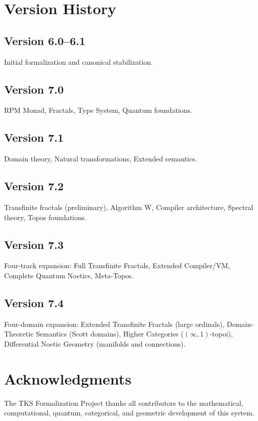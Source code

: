 \documentclass[11pt,twoside,openright]{book}
\theoremstyle{definition}
\theoremstyle{plain}
\theoremstyle{remark}
\begin{document}
\chapter{Version History}
\label{ch:version-history}

\section{Version 6.0--6.1}
Initial formalization and canonical stabilization.

\section{Version 7.0}
RPM Monad, Fractals, Type System, Quantum foundations.

\section{Version 7.1}
Domain theory, Natural transformations, Extended semantics.

\section{Version 7.2}
Transfinite fractals (preliminary), Algorithm W, Compiler architecture, Spectral theory, Topos foundations.

\section{Version 7.3}
Four-track expansion: Full Transfinite Fractals, Extended Compiler/VM, Complete Quantum Noetics, Meta-Topos.

\section{Version 7.4}
Four-domain expansion: Extended Transfinite Fractals (large ordinals), Domain-Theoretic Semantics (Scott domains), Higher Categories ($(\infty,1)$-topoi), Differential Noetic Geometry (manifolds and connections).

\backmatter

\chapter*{Acknowledgments}

The TKS Formalization Project thanks all contributors to the mathematical, computational, quantum, categorical, and geometric development of this system.
\end{document}
